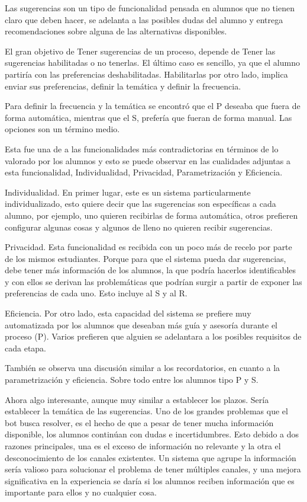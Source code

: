         \par Las sugerencias son un tipo de funcionalidad pensada en alumnos que no tienen claro que deben hacer, se adelanta a las posibles dudas del alumno y entrega recomendaciones sobre alguna de las alternativas disponibles.
        \par El gran objetivo de Tener sugerencias de un proceso, depende de Tener las sugerencias habilitadas o no tenerlas. El último caso es sencillo, ya que el alumno partiría con las preferencias deshabilitadas. Habilitarlas por otro lado, implica enviar sus preferencias, definir la temática y definir la frecuencia.
        \par Para definir la frecuencia y la temática se encontró que el \acrshort{P} deseaba que fuera de forma automática, mientras que el \acrshort{S}, prefería que fueran de forma manual. Las opciones son un término medio.
        \par Esta fue una de a las funcionalidades más contradictorias en términos de lo valorado por los alumnos y esto se puede observar en las cualidades adjuntas a esta funcionalidad, Individualidad, Privacidad, Parametrización y Eficiencia.
        \par Individualidad. En primer lugar, este es un sistema particularmente individualizado, esto quiere decir que las sugerencias son específicas a cada alumno, por ejemplo, uno quieren recibirlas de forma automática, otros prefieren configurar algunas cosas y algunos de lleno no quieren recibir sugerencias.
        \par Privacidad. Esta funcionalidad es recibida con un poco más de recelo por parte de los mismos estudiantes. Porque para que el sistema pueda dar sugerencias, debe tener más información de los alumnos, la que podría hacerlos identificables y con ellos se derivan las problemáticas que podrían surgir a partir de exponer las preferencias de cada uno. Esto incluye al \acrlong{S} y al \acrlong{R}.
        \par Eficiencia. Por otro lado, esta capacidad del sistema se prefiere muy automatizada por los alumnos que deseaban más guía y asesoría durante el proceso (\acrshort{P}). Varios prefieren que alguien se adelantara a los posibles requisitos de cada etapa.
        \par También se observa una discusión similar a los recordatorios, en cuanto a la parametrización y eficiencia. Sobre todo entre los alumnos tipo \acrshort{P} y \acrshort{S}.
        \par Ahora algo interesante, aunque muy similar a establecer los plazos. Sería establecer la temática de las sugerencias. Uno de los grandes problemas que el bot busca resolver, es el hecho de que a pesar de tener mucha información disponible, los alumnos continúan con dudas e incertidumbres. Esto debido a dos razones principales, una es el exceso de información no relevante y la otra el desconocimiento de los canales existentes. Un sistema que agrupe la información sería valioso para solucionar el problema de tener múltiples canales, y una mejora significativa en la experiencia se daría si los alumnos reciben información que es importante para ellos y no cualquier cosa.

